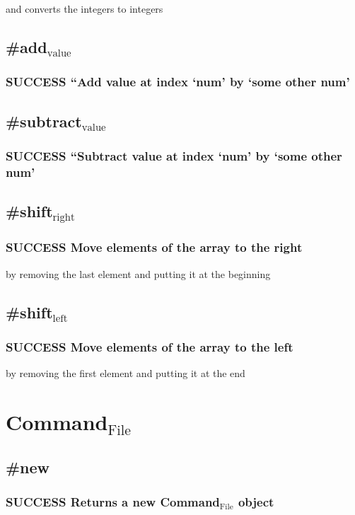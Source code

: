 \documentclass{article}
\begin{document}
        and converts the integers to integers
\subsection{\#add$_{\mathrm{value}}$}
\label{sec-3-2}
\subsubsection{\textbf{SUCCESS} ``Add value at index `num' by `some other num'}
\label{sec-3-2-1}
\subsection{\#subtract$_{\mathrm{value}}$}
\label{sec-3-3}
\subsubsection{\textbf{SUCCESS} ``Subtract value at index `num' by `some other num'}
\label{sec-3-3-1}
\subsection{\#shift$_{\mathrm{right}}$}
\label{sec-3-4}
\subsubsection{\textbf{SUCCESS} Move elements of the array to the right}
\label{sec-3-4-1}

        by removing the last element and
        putting it at the beginning
\subsection{\#shift$_{\mathrm{left}}$}
\label{sec-3-5}
\subsubsection{\textbf{SUCCESS} Move elements of the array to the left}
\label{sec-3-5-1}

        by removing the first element and
        putting it at the end
\section{Command$_{\mathrm{File}}$}
\label{sec-4}
\subsection{\#new}
\label{sec-4-1}
\subsubsection{\textbf{SUCCESS} Returns a new Command$_{\mathrm{File}}$ object}
\label{sec-4-1-1}
\end{document}
